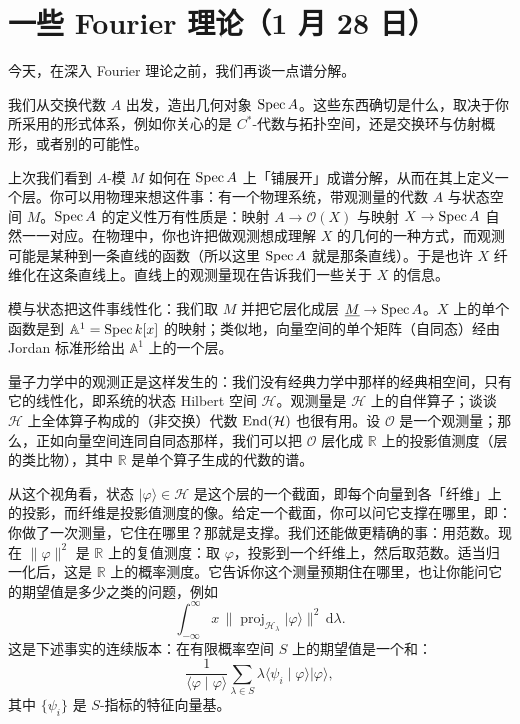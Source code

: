 \section[一些 Fourier 理论]{一些 Fourier 理论（1 月 28 日）}

今天，在深入 Fourier 理论之前，我们再谈一点谱分解。

我们从交换代数 $A$ 出发，造出几何对象 $\operatorname{Spec} A$。这些东西确切是什么，取决于你所采用的形式体系，例如你关心的是 $C^*$-代数与拓扑空间，还是交换环与仿射概形，或者别的可能性。


上次我们看到 $A$-模 $M$ 如何在 $\operatorname{Spec} A$ 上「铺展开」成谱分解，从而在其上定义一个层。你可以用物理来想这件事：有一个物理系统，带观测量的代数 $A$ 与状态空间 $M$。$\operatorname{Spec} A$ 的定义性万有性质是：映射 $A\to\mathcal{O}(X)$ 与映射 $X\to\operatorname{Spec} A$ 自然一一对应。在物理中，你也许把做观测想成理解 $X$ 的几何的一种方式，而观测可能是某种到一条直线的函数（所以这里 $\operatorname{Spec} A$ 就是那条直线）。于是也许 $X$ 纤维化在这条直线上。直线上的观测量现在告诉我们一些关于 $X$ 的信息。

模与状态把这件事线性化：我们取 $M$ 并把它层化成层 $\underline{M}\to\operatorname{Spec} A$。$X$ 上的单个函数是到 $\mathbb{A}^1=\operatorname{Spec} k[x]$ 的映射；类似地，向量空间的单个矩阵（自同态）经由 Jordan 标准形给出 $\mathbb{A}^1$ 上的一个层。

量子力学中的观测正是这样发生的：我们没有经典力学中那样的经典相空间，只有它的线性化，即系统的状态 Hilbert 空间 $\mathcal{H}$。观测量是 $\mathcal{H}$ 上的自伴算子；谈谈 $\mathcal{H}$ 上全体算子构成的（非交换）代数 $\operatorname{End}(\mathcal{H})$ 也很有用。设 $\mathcal{O}$ 是一个观测量；那么，正如向量空间连同自同态那样，我们可以把 $\mathcal{O}$ 层化成 $\mathbb{R}$ 上的投影值测度（层的类比物），其中 $\mathbb{R}$ 是单个算子生成的代数的谱。

从这个视角看，状态 $|\varphi\rangle\in\mathcal{H}$ 是这个层的一个截面，即每个向量到各「纤维」上的投影，而纤维是投影值测度的像。给定一个截面，你可以问它支撑在哪里，即：你做了一次测量，它住在哪里？那就是支撑。我们还能做更精确的事：用范数。现在 $\|\varphi\|^2$ 是 $\mathbb{R}$ 上的复值测度：取 $\varphi$，投影到一个纤维上，然后取范数。适当归一化后，这是 $\mathbb{R}$ 上的概率测度。它告诉你这个测量预期住在哪里，也让你能问它的期望值是多少之类的问题，例如
\[
\int_{-\infty}^{\infty}x\,\|\operatorname{proj}_{\mathcal{H}_\lambda}|\varphi\rangle\|^2\,\mathrm{d}\lambda.
\]
这是下述事实的连续版本：在有限概率空间 $S$ 上的期望值是一个和：
\[
\frac{1}{\langle\varphi\mid\varphi\rangle}\sum_{\lambda\in S}\lambda\langle\psi_i\mid\varphi\rangle|\varphi\rangle,
\]
其中 $\{\psi_i\}$ 是 $S$-指标的特征向量基。

